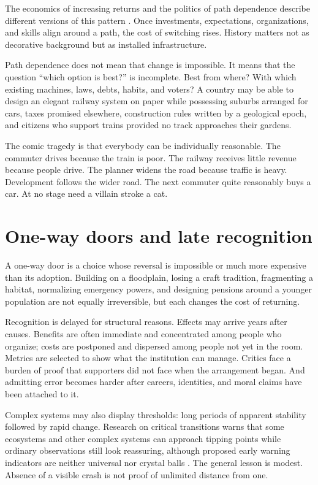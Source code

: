 \documentclass[12pt,a4paper]{book}
\begin{document}
The economics of increasing returns and the politics of path dependence
describe different versions of this pattern \cite{Arthur1989,Pierson2000}.
Once investments, expectations, organizations, and skills align around a path,
the cost of switching rises.  History matters not as decorative background but
as installed infrastructure.

Path dependence does not mean that change is impossible.  It means that the
question ``which option is best?'' is incomplete.  Best from where?  With which
existing machines, laws, debts, habits, and voters?  A country may be able to
design an elegant railway system on paper while possessing suburbs arranged
for cars, taxes promised elsewhere, construction rules written by a geological
epoch, and citizens who support trains provided no track approaches their
gardens.

The comic tragedy is that everybody can be individually reasonable.  The
commuter drives because the train is poor.  The railway receives little
revenue because people drive.  The planner widens the road because traffic is
heavy.  Development follows the wider road.  The next commuter quite
reasonably buys a car.  At no stage need a villain stroke a cat.

\section{One-way doors and late recognition}

A one-way door is a choice whose reversal is impossible or much more expensive
than its adoption.  Building on a floodplain, losing a craft tradition,
fragmenting a habitat, normalizing emergency powers, and designing pensions
around a younger population are not equally irreversible, but each changes
the cost of returning.

Recognition is delayed for structural reasons.  Effects may arrive years
after causes.  Benefits are often immediate and concentrated among people who
organize; costs are postponed and dispersed among people not yet in the room.
Metrics are selected to show what the institution can manage.  Critics face a
burden of proof that supporters did not face when the arrangement began.  And
admitting error becomes harder after careers, identities, and moral claims have
been attached to it.

Complex systems may also display thresholds: long periods of apparent
stability followed by rapid change.  Research on critical transitions warns
that some ecosystems and other complex systems can approach tipping points
while ordinary observations still look reassuring, although proposed early
warning indicators are neither universal nor crystal balls
\cite{SchefferEarlyWarning2009}.  The general lesson is modest.  Absence of a
visible crash is not proof of unlimited distance from one.
\end{document}

